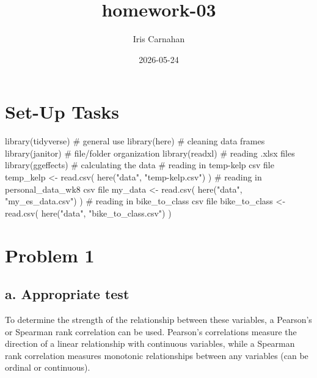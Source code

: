 \documentclass[
  letterpaper,
  DIV=11,
  numbers=noendperiod]{scrartcl}
\title{homework-03}
\author{Iris Carnahan}
\date{2026-05-24}
\newenvironment{Shaded}{\begin{snugshade}}{\end{snugshade}}
\newcommand{\CommentTok}[1]{\textcolor[rgb]{0.37,0.37,0.37}{#1}}
\newcommand{\FunctionTok}[1]{\textcolor[rgb]{0.28,0.35,0.67}{#1}}
\newcommand{\NormalTok}[1]{\textcolor[rgb]{0.00,0.23,0.31}{#1}}
\newcommand{\OtherTok}[1]{\textcolor[rgb]{0.00,0.23,0.31}{#1}}
\newcommand{\StringTok}[1]{\textcolor[rgb]{0.13,0.47,0.30}{#1}}
\begin{document}
\maketitle


\section{Set-Up Tasks}\label{set-up-tasks}

\begin{Shaded}
\begin{Highlighting}[]
\FunctionTok{library}\NormalTok{(tidyverse) }\CommentTok{\# general use}
\FunctionTok{library}\NormalTok{(here) }\CommentTok{\# cleaning data frames}
\FunctionTok{library}\NormalTok{(janitor) }\CommentTok{\# file/folder organization}
\FunctionTok{library}\NormalTok{(readxl) }\CommentTok{\# reading .xlsx files}
\FunctionTok{library}\NormalTok{(ggeffects) }\CommentTok{\# calculating the data}
\CommentTok{\# reading in \textasciigrave{}temp{-}kelp\textasciigrave{} csv file}
\NormalTok{temp\_kelp }\OtherTok{\textless{}{-}} \FunctionTok{read.csv}\NormalTok{(}
  \FunctionTok{here}\NormalTok{(}\StringTok{"data"}\NormalTok{, }\StringTok{"temp{-}kelp.csv"}\NormalTok{)}
\NormalTok{)}
\CommentTok{\# reading in \textasciigrave{}personal\_data\_wk8\textasciigrave{} csv file}
\NormalTok{my\_data }\OtherTok{\textless{}{-}} \FunctionTok{read.csv}\NormalTok{(}
  \FunctionTok{here}\NormalTok{(}\StringTok{"data"}\NormalTok{, }\StringTok{"my\_es\_data.csv"}\NormalTok{)}
\NormalTok{)}
\CommentTok{\# reading in \textasciigrave{}bike\_to\_class\textasciigrave{} csv file}
\NormalTok{bike\_to\_class }\OtherTok{\textless{}{-}} \FunctionTok{read.csv}\NormalTok{(}
  \FunctionTok{here}\NormalTok{(}\StringTok{"data"}\NormalTok{, }\StringTok{"bike\_to\_class.csv"}\NormalTok{)}
\NormalTok{)}
\end{Highlighting}
\end{Shaded}

\section{Problem 1}\label{problem-1}

\subsection{a. Appropriate test}\label{a.-appropriate-test}

To determine the strength of the relationship between these variables, a
Pearson's or Spearman rank correlation can be used. Pearson's
correlations measure the direction of a linear relationship with
continuous variables, while a Spearman rank correlation measures
monotonic relationships between any variables (can be ordinal or
continuous).
\end{document}
